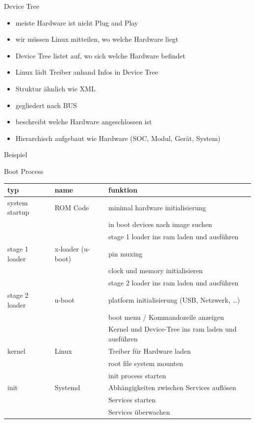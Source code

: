 \begin{frame}{Device Tree}
	\begin{itemize}
		\item meiste Hardware ist nicht Plug and Play
		\item wir müssen Linux mitteilen, wo welche Hardware liegt
		\item Device Tree listet auf, wo sich welche Hardware befindet
		\item Linux lädt Treiber anhand Infos in Device Tree
	\end{itemize}
	\begin{itemize}
		\item Struktur ähnlich wie XML
		\item gegliedert nach BUS
		\item beschreibt welche Hardware angeschlossen ist
		\item Hierarchisch aufgebaut wie Hardware (SOC, Modul, Gerät, System)
	\end{itemize}
	Beispiel
\end{frame}

\begin{frame}{Boot Process \cite{OMAPBootloaderOverview}}
	\begin{tabular}{|l|l|l|}
		\hline typ & name & funktion \\ 
		\hline system startup & ROM Code & minimal hardware initialisierung \\ 
		& & in boot devices nach image suchen \\
		& & stage 1 loader ins ram laden und ausführen \\
		
		\hline stage 1 loader & x-loader (u-boot) & pin muxing \\ 
		& & clock und memory initialisieren \\
		& & stage 2 loader ins ram laden und ausführen \\
		
		\hline stage 2 loader & u-boot & platform initialisierung (USB, Netzwerk, \ldots) \\
		& & boot menu / Kommandozeile anzeigen \\
		& & Kernel und Device-Tree ins ram laden und ausführen \\
		
		\hline kernel & Linux & Treiber für Hardware laden \\ 
		& & root file system mounten \\
		& & init process starten \\
		
		\hline init & Systemd & Abhängigkeiten zwischen Services auflösen \\ 
		& & Services starten \\
		& & Services überwachen \\
		
		\hline 
	\end{tabular} 
\end{frame}

